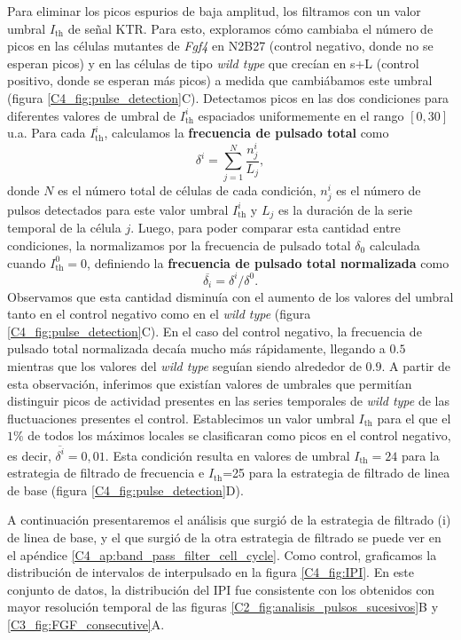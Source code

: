 \documentclass[./main.tex]{subfiles}
\begin{document}
Para eliminar los picos espurios de baja amplitud, los filtramos con un valor umbral $I_{\text{th}}$ de señal KTR. Para esto, exploramos cómo cambiaba el número de picos en las células mutantes de \textit{Fgf4} en N2B27 (control negativo, donde no se esperan picos) y en las células de tipo \textit{wild type} que crecían en s+L (control positivo, donde se esperan más picos) a medida que cambiábamos este umbral (figura \ref{C4_fig:pulse_detection}C). Detectamos picos en las dos condiciones para diferentes valores de umbral de $I_{\text{th}}^i$ espaciados uniformemente en el rango $[0, 30] $u.a. Para cada $I_{\text{th}}^i$, calculamos la \textbf{frecuencia de pulsado total} como
\begin{equation}
    \delta^i = \sum_{j=1}^N \frac{n_j^i}{L_j},
\end{equation}
donde $N$ es el número total de células de cada condición, $n_j^i$ es el número de pulsos detectados para este valor umbral $I_{\text{th}}^i$ y $L_j$ es la duración de la serie temporal de la célula $j$. Luego, para poder comparar esta cantidad entre condiciones, la normalizamos por la frecuencia de pulsado total $\delta_0$ calculada cuando $I_{\text{th}}^0=0$, definiendo la \textbf{frecuencia de pulsado total normalizada} como 
\begin{equation}
     \overline{\delta_i} =  \delta^i / \delta^0.
\end{equation}
Observamos que esta cantidad disminuía con el aumento de los valores del umbral tanto en el control negativo como en el \textit{wild type} (figura \ref{C4_fig:pulse_detection}C). En el caso del control negativo, la frecuencia de pulsado total normalizada decaía mucho más rápidamente, llegando a $0.5$ mientras que los valores del \textit{wild type} seguían siendo alrededor de $0.9$. A partir de esta observación, inferimos que existían valores de umbrales que permitían distinguir picos de actividad presentes en las series temporales de \textit{wild type} de las fluctuaciones presentes el control. Establecimos un valor umbral $I_{\text{th}}$ para el que el $1 \%$ de todos los máximos locales se clasificaran como picos en el control negativo, es decir, $\overline{\delta^i}=0,01$. Esta condición resulta en valores de umbral $I_{\text{th}}=24$ para la estrategia de filtrado de frecuencia e $I_{\text{th}}$=25 para la estrategia de filtrado de linea de base (figura \ref{C4_fig:pulse_detection}D). 


A continuación presentaremos el análisis que surgió de la estrategia de filtrado (i) de linea de base, y el que surgió de la otra estrategia de filtrado se puede ver en el apéndice \ref{C4_ap:band_pass_filter_cell_cycle}. Como control, graficamos la distribución de intervalos de interpulsado en la figura \ref{C4_fig:IPI}. En este conjunto de datos, la distribución del IPI fue consistente con los obtenidos con mayor resolución temporal de las figuras \ref{C2_fig:analisis_pulsos_sucesivos}B y \ref{C3_fig:FGF_consecutive}A. 
\end{document}
